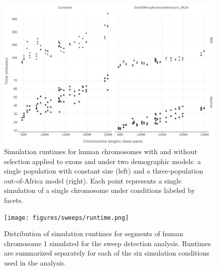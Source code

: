 \documentclass[hidelinks]{article}
\newcommand{\stopsupplement}{%
        \setcounter{table}{0}
        \renewcommand{\thetable}{\arabic{table}}%
        \setcounter{figure}{0}
        \renewcommand{\thefigure}{\arabic{figure}}%
     }
\begin{document}
\begin{figure}[h]
    \centering
    \includegraphics[width=0.8 \textwidth]{figures/HomSap/sims_runtime_plot.pdf}
    \caption{
    Simulation runtimes for human chromosomes with and without selection applied to exons and under two demographic models:
    a single population with constant size (left) and a three-population out-of-Africa model (right).
    Each point represents a single simulation of a single chromosome under conditions labeled by facets.
    }
    \label{fig:sim-runtime}
\end{figure}

\begin{figure}[h]
    \centering
    \texttt{[image: figures/sweeps/runtime.png]}
    \caption{
    Distribution of simulation runtimes for segments of human chromosome 1 simulated for the sweep detection analysis.
    Runtimes are summarized separately for each of the six simulation conditions used in the analysis.
    }
    \label{fig:sim-sweeps-runtime}
\end{figure}

\stopsupplement

\end{document}
